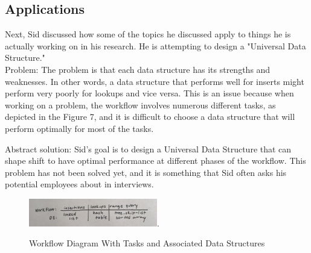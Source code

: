 \subsection{Applications}

Next, Sid discussed how some of the topics he discussed apply to things he is actually working on in his research. He is attempting to design a "Universal Data Structure."\\

\vspace{3mm}
Problem: The problem is that each data structure has its strengths and weaknesses. In other words, a data structure that performs well for inserts might perform very poorly for lookups and vice versa. This is an issue because when working on a problem, the workflow involves numerous different tasks, as depicted in the Figure 7, and it is difficult to choose a data structure that will perform optimally for most of the tasks. 

\vspace{3mm}
Abstract solution: Sid's goal is to design a Universal Data Structure that can shape shift to have optimal performance at different phases of the workflow. This problem has not been solved yet, and it is something that Sid often asks his potential employees about in interviews.
\vspace{3mm}

 \begin{figure}[h!]
  \begin{center}
    \includegraphics[width=0.5\textwidth]{figures/IMG_8829.jpg}.
    \caption{
      Workflow Diagram With Tasks and Associated Data Structures}
    \label{fig:example_figure}
  \end{center}
\end{figure}



